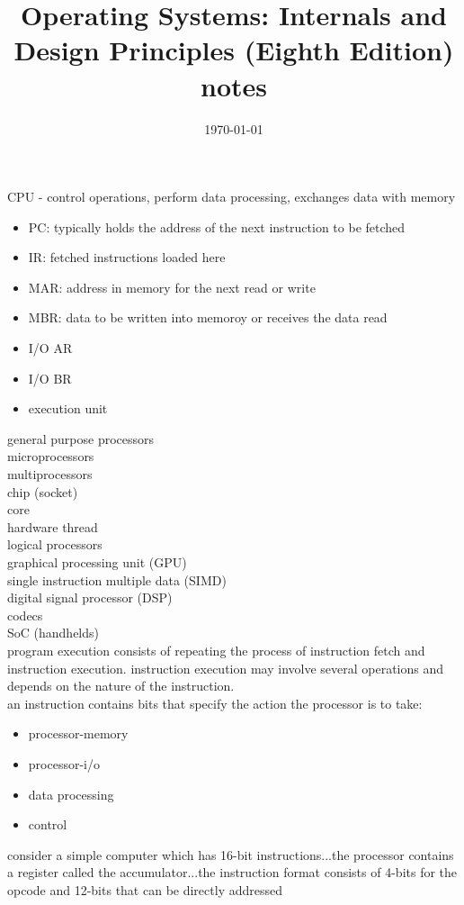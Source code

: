 \documentclass{article}
\title{Operating Systems: Internals and Design Principles (Eighth Edition) notes}
\date{\today}
\begin{document}
CPU - control operations, perform data processing, exchanges data with memory 
	\begin{itemize}
		\item PC: typically holds the address of the next instruction to be fetched
		\item IR: fetched instructions loaded here
		\item MAR: address in memory for the next read or write
		\item MBR: data to be written into memoroy or receives the data read
		\item I/O AR
		\item I/O BR
		\item execution unit
	\end{itemize}

general purpose processors\\
microprocessors\\
multiprocessors\\
chip (socket)\\
core\\
hardware thread\\
logical processors\\
graphical processing unit (GPU)\\
single instruction multiple data (SIMD)\\
digital signal processor (DSP)\\
codecs\\
SoC (handhelds)\\

program execution consists of repeating the process of instruction fetch and instruction execution. instruction execution may involve several operations and depends on the nature of the instruction.\\

an instruction contains bits that specify the action the processor is to take:
	\begin{itemize}
		\item processor-memory
		\item processor-i/o
		\item data processing
		\item control
	\end{itemize}

consider a simple computer which has 16-bit instructions...the processor contains a register called the accumulator...the instruction format consists of 4-bits for the opcode and 12-bits that can be directly addressed\\
\end{document}
